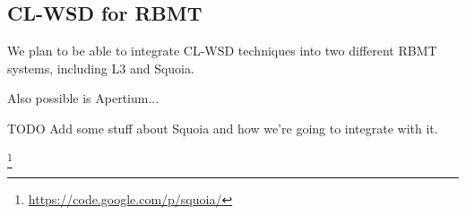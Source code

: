 \subsection{CL-WSD for RBMT}
We plan to be able to integrate CL-WSD techniques into two different RBMT
systems, including L3 \cite{gasser:sxdg} and Squoia.

Also possible is Apertium...

TODO Add some stuff about Squoia and how we're going to integrate with it.
\cite{riosgonzales-gohring:2013:HyTra}

\footnote{\url{https://code.google.com/p/squoia/}}

